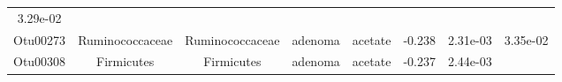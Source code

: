 \documentclass[11pt,]{article}
\begin{document}
\begin{longtable}[]{@{}cccccccc@{}}
\begin{minipage}[t]{0.08\columnwidth}
3.29e-02\strut
\end{minipage}\tabularnewline
\begin{minipage}[t]{0.08\columnwidth}\centering\strut
Otu00273\strut
\end{minipage} & \begin{minipage}[t]{0.15\columnwidth}\centering\strut
Ruminococcaceae\strut
\end{minipage} & \begin{minipage}[t]{0.15\columnwidth}\centering\strut
Ruminococcaceae\strut
\end{minipage} & \begin{minipage}[t]{0.08\columnwidth}\centering\strut
adenoma\strut
\end{minipage} & \begin{minipage}[t]{0.09\columnwidth}\centering\strut
acetate\strut
\end{minipage} & \begin{minipage}[t]{0.07\columnwidth}\centering\strut
-0.238\strut
\end{minipage} & \begin{minipage}[t]{0.08\columnwidth}\centering\strut
2.31e-03\strut
\end{minipage} & \begin{minipage}[t]{0.08\columnwidth}\centering\strut
3.35e-02\strut
\end{minipage}\tabularnewline
\begin{minipage}[t]{0.08\columnwidth}\centering\strut
Otu00308\strut
\end{minipage} & \begin{minipage}[t]{0.15\columnwidth}\centering\strut
Firmicutes\strut
\end{minipage} & \begin{minipage}[t]{0.15\columnwidth}\centering\strut
Firmicutes\strut
\end{minipage} & \begin{minipage}[t]{0.08\columnwidth}\centering\strut
adenoma\strut
\end{minipage} & \begin{minipage}[t]{0.09\columnwidth}\centering\strut
acetate\strut
\end{minipage} & \begin{minipage}[t]{0.07\columnwidth}\centering\strut
-0.237\strut
\end{minipage} & \begin{minipage}[t]{0.08\columnwidth}\centering\strut
2.44e-03\strut
\end{minipage} & \begin{minipage}[t]{0.08\columnwidth}\centering\strut

\end{minipage}
\end{longtable}
\end{document}
